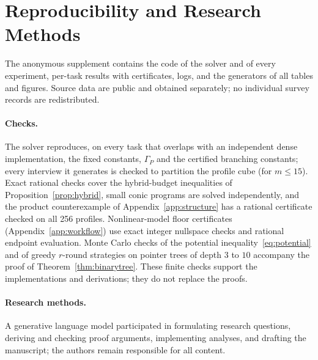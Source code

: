\section{Reproducibility and Research Methods}\label{app:repro}
The anonymous supplement contains the code of the solver and of every experiment, per-task results with certificates, logs, and the generators of all tables and figures. Source data are public and obtained separately; no individual survey records are redistributed.

\paragraph{Checks.}
The solver reproduces, on every task that overlaps with an independent dense implementation, the fixed constants, $\Gamma_P$ and the certified branching constants; every interview it generates is checked to partition the profile cube (for $m\le15$). Exact rational checks cover the hybrid-budget inequalities of Proposition~\ref{prop:hybrid}, small conic programs are solved independently, and the product counterexample of Appendix~\ref{app:structure} has a rational certificate checked on all 256 profiles. Nonlinear-model floor certificates (Appendix~\ref{app:workflow}) use exact integer nullspace checks and rational endpoint evaluation. Monte Carlo checks of the potential inequality~\eqref{eq:potential} and of greedy $r$-round strategies on pointer trees of depth $3$ to $10$ accompany the proof of Theorem~\ref{thm:binarytree}. These finite checks support the implementations and derivations; they do not replace the proofs.

\paragraph{Research methods.}
A generative language model participated in formulating research questions, deriving and checking proof arguments, implementing analyses, and drafting the manuscript; the authors remain responsible for all content.
